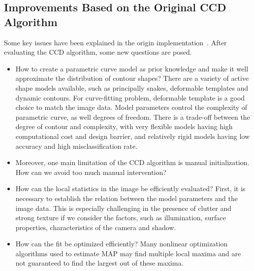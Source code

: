 

\subsection{Improvements Based on the Original CCD Algorithm}
\label{sec:prob}
Some key issues have been explained in the origin
implementation~\cite{hanek2004contracting}.
After evaluating the CCD algorithm, some new questions are posed.

\begin{itemize}
\item How to create a parametric curve model as prior knowledge and
  make it well approximate the distribution of contour shapes? 
There are a variety of active shape models available, such as principally snakes,
  deformable templates and dynamic contours. For curve-fitting
  problem, deformable template is a good choice to match the image
  data. Model parameters control the complexity of parametric curve,
  as well degrees of freedom. There is a trade-off between the degree
  of contour and complexity, with very flexible models having high
  computational cost and design barrier, and relatively rigid models
  having low accuracy and high misclassification rate. 

\item Moreover, one
  main limitation of the CCD algorithm is manual initialization. How can
  we avoid too much manual intervention?

\item How can the local statistics in the image be efficiently
  evaluated? First, it is necessary to establish the relation between the model parameters
  and the image data. This is especially challenging in the presence
  of clutter and strong texture if we consider the factors, such as
  illumination, surface properties, characteristics of the camera and
  shadow. 

\item How can the fit be optimized efficiently? Many
  nonlinear optimization algorithms used to estimate MAP may find
  multiple local maxima and  are not guaranteed to find the largest
  out of these maxima.
\end{itemize}

